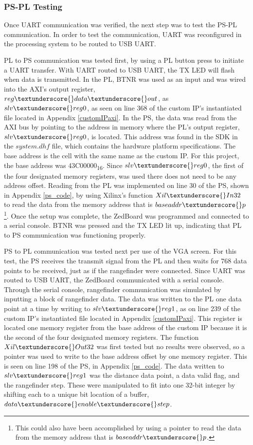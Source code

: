 \subsubsection{PS-PL Testing}
Once UART communication was verified, the next step was to test the PS-PL communication. In order to test the communication, UART was reconfigured in the processing system to be routed to USB UART.
\par
PL to PS communication was tested first, by using a PL button press to initiate a UART transfer. With UART routed to USB UART, the TX LED will flash when data is transmitted. In the PL, BTNR was used as an input and was wired into the AXI's output register, $reg\textunderscore{}data\textunderscore{}out$, as $slv\textunderscore{}reg0$, as seen on line 368 of the custom IP's instantiated file located in Appendix \ref{customIPaxi}. In the PS, the data was read from the AXI bus by pointing to the address in memory where the PL's output register, $slv\textunderscore{}reg0$, is located. This address was found in the SDK in the $system.dhf$ file, which contains the hardware platform specifications. The base address is the cell with the same name as the custom IP. For this project, the base address was 43C00000\textsubscript{16}. Since $slv\textunderscore{}reg0$, the first of the four designated memory registers, was used there does not need to be any address offset. Reading from the PL was implemented on line 30 of the PS, shown in Appendix \ref{ps_code}, by using Xilinx's function $Xil\textunderscore{}In32$ to read the data from the memory address that is $baseaddr\textunderscore{}p$\footnote{This could also have been accomplished by using a pointer to read the data from the memory address that is $baseaddr\textunderscore{}p$.}. Once the setup was complete, the ZedBoard was programmed and connected to a serial console. BTNR was pressed and the TX LED lit up, indicating that PL to PS communication was functioning properly.
\par
PS to PL communication was tested next per use of the VGA screen. For this test, the PS receives the transmit signal from the PL and then waits for 768 data points to be received, just as if the rangefinder were connected. Since UART was routed to USB UART, the ZedBoard communicated with a serial console. Through the serial console, rangefinder communication was simulated by inputting a block of rangefinder data. The data was written to the PL one data point at a time by writing to $slv\textunderscore{}reg1$, as on line 239 of the custom IP's instantiated file located in Appendix \ref{customIPaxi}. This register is located one memory register from the base address of the custom IP because it is the second of the four designated memory registers. The function $Xil\textunderscore{}Out32$ was first tested but no results were observed, so a pointer was used to write to the base address offset by one memory register. This is seen on line 198 of the PS, in Appendix \ref{ps_code}. The data written to $slv\textunderscore{}reg1$ was the distance data point, a data valid flag, and the rangefinder step. These were manipulated to fit into one 32-bit integer by shifting each to a unique bit location of a buffer, $data\textunderscore{}enable\textunderscore{}step$.
